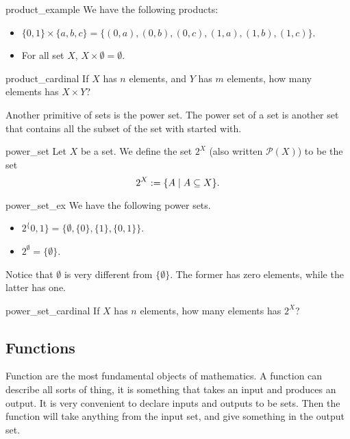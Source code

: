 \begin{cexp}{}{product_example}
    We have the following products:
    \begin{itemize}
        \item \( \{ 0, 1 \} \times \{ a, b, c \} = \{ (0, a), (0, b), (0, c), (1, a), (1, b), (1, c) \} \).
        \item For all set \( X \), \( X \times \emptyset = \emptyset \).
    \end{itemize}
\end{cexp}

\begin{cex}{}{product_cardinal}
    If \( X \) has \( n \) elements, and \( Y \) has \( m \) elements, how many elements has \( X \times Y \)?
\end{cex}

Another primitive of sets is the power set. The power set of a set is another set that contains all the subset of the set with started with.
\begin{cdef}{}{power_set}
    Let \( X \) be a set. We define the set \( 2^X \) (also written \( \mathcal{P}(X) \)) to be the set 
    \begin{equation*}
        2^X := \{ A \mid A \subseteq X \}.
    \end{equation*}
\end{cdef} 

\begin{cexp}{}{power_set_ex}
    We have the following power sets.
    \begin{itemize}
        \item \( 2^\{0, 1\} = \{ \emptyset, \{ 0 \}, \{ 1\}, \{ 0, 1\} \}\).
        \item \( 2^\emptyset = \{ \emptyset \} \).
    \end{itemize}
    Notice that \( \emptyset \) is very different from \( \{ \emptyset \} \). The former has zero elements, while the latter has one.
\end{cexp}

\begin{cex}{}{power_set_cardinal}
    If \( X \) has \( n \) elements, how many elements has \( 2^X \)?
\end{cex}


\subsection{Functions}

Function are the most fundamental objects of mathematics. A function can describe all sorts of thing, it is something that takes an input and produces an output. It is very convenient to declare inputs and outputs to be sets. Then the function will take anything from the input set, and give something in the output set.   

